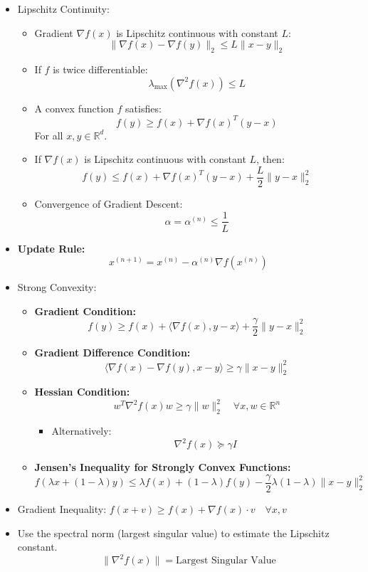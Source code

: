 \documentclass{article}
\begin{document}
\begin{itemize}
\begin{itemize}
\end{itemize}

\item Lipschitz Continuity:
\begin{itemize}
    \item Gradient $\nabla f(x)$ is Lipschitz continuous with constant $L$:
    \[
    \|\nabla f(x) - \nabla f(y)\|_2 \leq L\|x - y\|_2
    \]
    \item If $f$ is twice differentiable:
    \[
    \lambda_{\max}(\nabla^2 f(x)) \leq L
    \]
        \item A convex function $f$ satisfies:
    \[
    f(y) \geq f(x) + \nabla f(x)^{T}(y - x)
    \] For all $x, y \in \mathbb{R}^{d}$.
        \item If $\nabla f(x)$ is Lipschitz continuous with constant $L$, then:
    \[
    f(y) \leq f(x) + \nabla f(x)^{T}(y - x) + \frac{L}{2}\|y - x\|^{2}_{2}
    \]
    \item Convergence of Gradient Descent:
    \[
\alpha = \alpha^{(n)} \leq \frac{1}{L}
\]
\end{itemize}

\item \textbf{Update Rule:}
    \begin{equation*}
    x^{(n+1)} = x^{(n)} - \alpha^{(n)} \nabla f(x^{(n)})
    \end{equation*}

\item Strong Convexity:
\begin{itemize}
    \item \textbf{Gradient Condition:}
    \[
    f(y) \geq f(x) + \langle \nabla f(x), y - x \rangle + \frac{\gamma}{2} \|y - x\|^2_2
    \]

    \item \textbf{Gradient Difference Condition:}
    \[
    \langle \nabla f(x) - \nabla f(y), x - y \rangle \geq \gamma \|x - y\|^2_2
    \]

    \item \textbf{Hessian Condition:}
    \[
    w^T \nabla^2 f(x) w \geq \gamma \|w\|^2_2 \quad \forall x, w \in \mathbb{R}^n
    \]
    \begin{itemize}
        \item Alternatively:
        \[
        \nabla^2 f(x) \succeq \gamma I
        \]
    \end{itemize}

    \item \textbf{Jensen's Inequality for Strongly Convex Functions:}
    \[
    f(\lambda x + (1 - \lambda) y) \leq \lambda f(x) + (1 - \lambda) f(y) - \frac{\gamma}{2} \lambda(1 - \lambda) \|x - y\|^2_2
    \]
\end{itemize}

\item Gradient Inequality:   $
    f(x + v) \geq f(x) + \nabla f(x) \cdot v \quad \forall x, v
    $

 \item Use the spectral norm (largest singular value) to estimate the Lipschitz constant.
    \[
    \|\nabla^2 f(x)\| = \text{Largest Singular Value}
    \]

\end{itemize}
\end{document}
